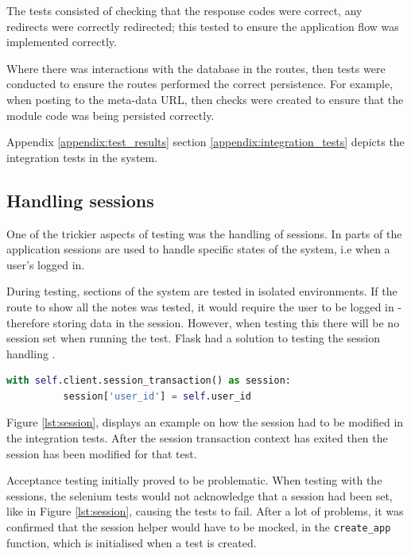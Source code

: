 The tests consisted of checking that the response codes were correct, any redirects were correctly redirected; this tested to ensure the application flow was implemented correctly.

Where there was interactions with the database in the routes, then tests were conducted to ensure the routes performed the correct persistence. For example, when posting to the meta-data URL, then checks were created to ensure that the module code was being persisted correctly.

Appendix \ref{appendix:test_results} section \ref{appendix:integration_tests} depicts the integration tests in the system.

\subsection{Handling sessions}
One of the trickier aspects of testing was the handling of sessions. In parts of the application sessions are used to handle specific states of the system, i.e when a user's logged in.

During testing, sections of the system are tested in isolated environments. If the route to show all the notes was tested, it would require the user to be logged in - therefore storing data in the session. However, when testing this there will be no session set when running the test. Flask had a solution to testing the session handling \cite{citeulike:14020609}.

\begin{lstlisting}[language=python, label={lst:session}, breaklines, columns=fullflexible, keywordstyle=\color{blue}, basicstyle=\normalsize\ttfamily, caption= {An example of how sessions were handled and modified in the tests.}]
  with self.client.session_transaction() as session:
          session['user_id'] = self.user_id
\end{lstlisting}

Figure \ref{lst:session}, displays an example on how the session had to be modified in the integration tests. After the session transaction context has exited then the session has been modified for that test.

Acceptance testing initially proved to be problematic. When testing with the sessions, the selenium tests would not acknowledge that a session had been set, like in Figure \ref{lst:session}, causing the tests to fail. After a lot of problems, it was confirmed that the session helper would have to be mocked, in the \lstinline[basicstyle=\normalsize\ttfamily]{create_app} function, which is initialised when a test is created.

